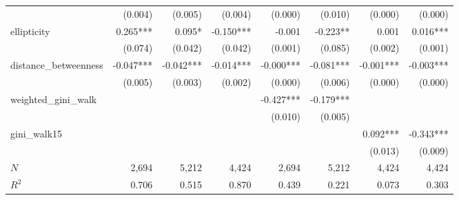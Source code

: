 \begin{tabular}{lrrrrrrr}
                      &                      (0.004) &                    (0.005) &                      (0.004) &                      (0.000) &                    (0.010) &                              (0.000) &                              (0.000) \\ 
ellipticity           &                     0.265*** &                     0.095* &                    -0.150*** &                       -0.001 &                   -0.223** &                                0.001 &                             0.016*** \\ 
                      &                      (0.074) &                    (0.042) &                      (0.042) &                      (0.001) &                    (0.085) &                              (0.002) &                              (0.001) \\ 
distance\_betweenness &                    -0.047*** &                  -0.042*** &                    -0.014*** &                    -0.000*** &                  -0.081*** &                            -0.001*** &                            -0.003*** \\ 
                      &                      (0.005) &                    (0.003) &                      (0.002) &                      (0.000) &                    (0.006) &                              (0.000) &                              (0.000) \\ 
weighted\_gini\_walk  &                              &                            &                              &                    -0.427*** &                  -0.179*** &                                      &                                      \\ 
                      &                              &                            &                              &                      (0.010) &                    (0.005) &                                      &                                      \\ 
gini\_walk15          &                              &                            &                              &                              &                            &                             0.092*** &                            -0.343*** \\ 
                      &                              &                            &                              &                              &                            &                              (0.013) &                              (0.009) \\ 
\midrule
$N$                   &                        2,694 &                      5,212 &                        4,424 &                        2,694 &                      5,212 &                                4,424 &                                4,424 \\ 
$R^2$                 &                        0.706 &                      0.515 &                        0.870 &                        0.439 &                      0.221 &                                0.073 &                                0.303 \\ 
\bottomrule
\end{tabular}

